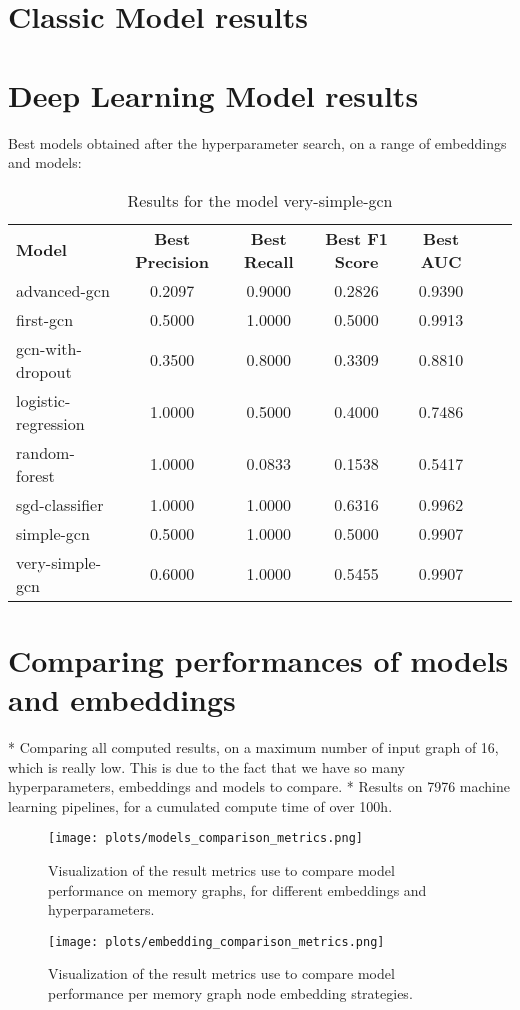 \section{Classic Model results}

\section{Deep Learning Model results}
Best models obtained after the hyperparameter search, on a range of embeddings and models:

\begin{table}[ht]
    \centering
    \caption{Results for the model very-simple-gcn}
    \begin{tabular}{lcccccc}
      \textbf{Model}  & \textbf{Best Precision} & \textbf{Best Recall} & \textbf{Best F1 Score} & \textbf{Best AUC} \\
        advanced-gcn & 0.2097 & 0.9000 & 0.2826 & 0.9390 \\
        first-gcn & 0.5000 & 1.0000 & 0.5000 & 0.9913 \\
        gcn-with-dropout & 0.3500 & 0.8000 & 0.3309 & 0.8810 \\
        logistic-regression & 1.0000 & 0.5000 & 0.4000 & 0.7486 \\
        random-forest & 1.0000 & 0.0833 & 0.1538 & 0.5417 \\
        sgd-classifier & 1.0000 & 1.0000 & 0.6316 & 0.9962 \\
        simple-gcn & 0.5000 & 1.0000 & 0.5000 & 0.9907 \\
        very-simple-gcn & 0.6000 & 1.0000 & 0.5455 & 0.9907 \\
    \end{tabular}
\end{table}

\section{Comparing performances of models and embeddings}
* Comparing all computed results, on a maximum number of input graph of 16, which is really low. This is due to the fact that we have so many hyperparameters, embeddings and models to compare.
* Results on 7976 machine learning pipelines, for a cumulated compute time of over 100h.

\begin{figure}[H]\label{results:compare:models:full}
    \centering
    \texttt{[image: plots/models\_comparison\_metrics.png]}
    \caption{Visualization of the result metrics use to compare model performance on memory graphs, for different embeddings and hyperparameters.}
\end{figure}

\begin{figure}[H]\label{results:compare:embeddings:full}
    \centering
    \texttt{[image: plots/embedding\_comparison\_metrics.png]}
    \caption{Visualization of the result metrics use to compare model performance per memory graph node embedding strategies.}
\end{figure}


